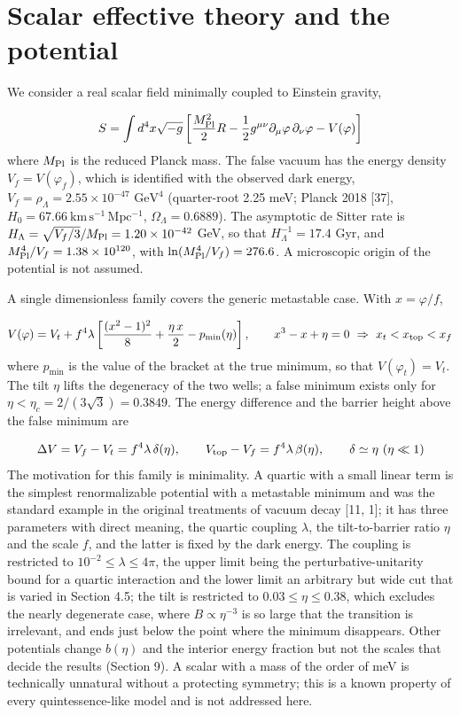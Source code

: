 \documentclass[11pt,a4paper]{article}
\begin{document}
\section{Scalar effective theory and the potential}
We consider a real scalar field minimally coupled to Einstein gravity,

\begin{equation}
S=\int d^4x\sqrt{-g}\left[\frac{M_{\rm Pl}^2}{2}R-\frac12 g^{\mu\nu}\partial_\mu\varphi\,\partial_\nu\varphi-V(\varphi)\right]
\end{equation}
where $M_{\rm Pl}$ is the reduced Planck mass. The false vacuum has the energy density $V_f = V(\varphi_f)$, which is identified with the observed dark energy, $V_f = \rho_\Lambda = 2.55\times10^{-47}$ $\mathrm{GeV}^4$ (quarter-root 2.25 meV; Planck 2018 [37], $H_0 = 67.66\ \mathrm{km\,s^{-1}\,Mpc^{-1}}$, $\Omega_\Lambda = 0.6889$). The asymptotic de Sitter rate is $H_\Lambda = \sqrt{V_f/3}/M_{\rm Pl} = 1.20\times10^{-42}$ GeV, so that $H_\Lambda^{-1} = 17.4$ Gyr, and $M_{\rm Pl}^4/V_f = 1.38\times10^{120}$, with $\ln(M_{\rm Pl}^4/V_f) = 276.6$. A microscopic origin of the potential is not assumed.

A single dimensionless family covers the generic metastable case. With $x = \varphi/f$,

\begin{equation}
V(\varphi)=V_t+f^4\lambda\left[\frac{(x^2-1)^2}{8}+\frac{\eta\,x}{2}-p_{\min}(\eta)\right],\qquad x^3-x+\eta=0\ \Rightarrow\ x_t<x_{\rm top}<x_f
\end{equation}
where $p_{\min}$ is the value of the bracket at the true minimum, so that $V(\varphi_t) = V_t$. The tilt $\eta$ lifts the degeneracy of the two wells; a false minimum exists only for $\eta < \eta_c = 2/(3\sqrt3) = 0.3849$. The energy difference and the barrier height above the false minimum are

\begin{equation}
\Delta V=V_f-V_t=f^4\lambda\,\delta(\eta),\qquad V_{\rm top}-V_f=f^4\lambda\,\beta(\eta),\qquad \delta\simeq\eta\ (\eta\ll1)
\end{equation}
The motivation for this family is minimality. A quartic with a small linear term is the simplest renormalizable potential with a metastable minimum and was the standard example in the original treatments of vacuum decay [11, 1]; it has three parameters with direct meaning, the quartic coupling $\lambda$, the tilt-to-barrier ratio $\eta$ and the scale $f$, and the latter is fixed by the dark energy. The coupling is restricted to $10^{-2}\le\lambda\le4\pi$, the upper limit being the perturbative-unitarity bound for a quartic interaction and the lower limit an arbitrary but wide cut that is varied in Section 4.5; the tilt is restricted to $0.03\le\eta\le0.38$, which excludes the nearly degenerate case, where $B\propto\eta^{-3}$ is so large that the transition is irrelevant, and ends just below the point where the minimum disappears. Other potentials change $b(\eta)$ and the interior energy fraction but not the scales that decide the results (Section 9). A scalar with a mass of the order of meV is technically unnatural without a protecting symmetry; this is a known property of every quintessence-like model and is not addressed here.
\end{document}
